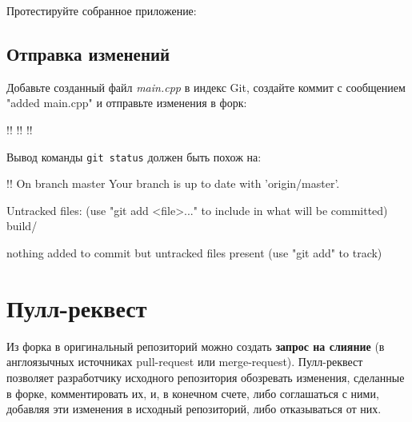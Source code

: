\documentclass[14pt]{extarticle}
\begin{document}
    Протестируйте собранное приложение:


    \subsection{Отправка изменений}

    Добавьте созданный файл \textit{main.cpp} в индекс Git, создайте коммит
    с сообщением "added main.cpp" и отправьте изменения в форк:

    \begin{terminalwindow}
!!
!!
!!
    \end{terminalwindow}

    Вывод команды \verb|git status| должен быть похож на:

    \begin{terminalwindow}
!!
On branch master
Your branch is up to date with 'origin/master'.

Untracked files:
  (use "git add <file>..." to include in what will be committed)
        build/

nothing added to commit but untracked files present (use "git add" to track)
    \end{terminalwindow}

\section{Пулл-реквест}

    Из форка\footnotemark{} в оригинальный репозиторий можно создать \textbf{запрос на слияние}
    (в англоязычных источниках pull-request или merge-request).
    Пулл-реквест позволяет разработчику исходного репозитория обозревать изменения,
    сделанные в форке, комментировать их, и, в конечном счете, либо соглашаться с ними,
    добавляя эти изменения в исходный репозиторий, либо отказываться от них.

\end{document}
